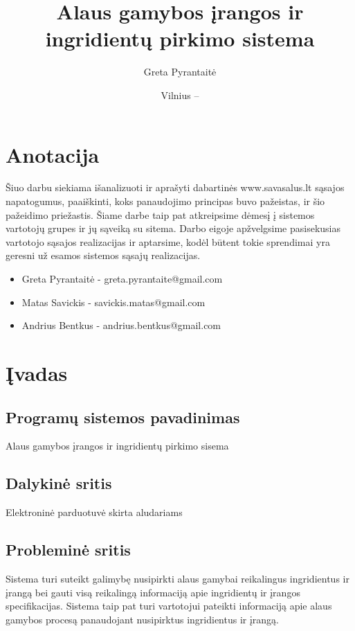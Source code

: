 \documentclass[oneside]{VUMIFPSkursinis}
\title{Alaus gamybos įrangos ir ingridientų pirkimo sistema}
\author{Greta Pyrantaitė}
\date{Vilnius – \the\year}
\begin{document}
\maketitle

\section{Anotacija}
Šiuo darbu siekiama išanalizuoti ir aprašyti dabartinės www.savasalus.lt sąsajos napatogumus, paaiškinti, koks panaudojimo principas buvo pažeistas, ir šio pažeidimo priežastis.
Šiame darbe taip pat atkreipsime dėmesį į sistemos vartotojų grupes ir jų sąveiką su sitema.
Darbo eigoje apžvelgsime pasisekusias vartotojo sąsajos realizacijas ir aptarsime, kodėl būtent tokie sprendimai yra geresni už esamos sistemos sąsajų realizacijas.

\begin{itemize}
	\item{Greta Pyrantaitė - greta.pyrantaite@gmail.com}
	\item{Matas Savickis - savickis.matas@gmail.com}
	\item{Andrius Bentkus - andrius.bentkus@gmail.com}
\end{itemize}

\tableofcontents

\section{Įvadas}
	\subsection{Programų sistemos pavadinimas}
		Alaus gamybos įrangos ir ingridientų pirkimo sisema
	\subsection{Dalykinė sritis}
		Elektroninė parduotuvė skirta aludariams
	\subsection{Probleminė sritis}
		Sistema turi suteikt galimybę nusipirkti alaus gamybai reikalingus ingridientus ir įrangą bei gauti visą reikalingą informaciją apie ingridientų ir įrangos specifikacijas.
		Sistema taip pat turi vartotojui pateikti informaciją apie alaus gamybos procesą panaudojant nusipirktus ingridientus ir įrangą.
\end{document}
